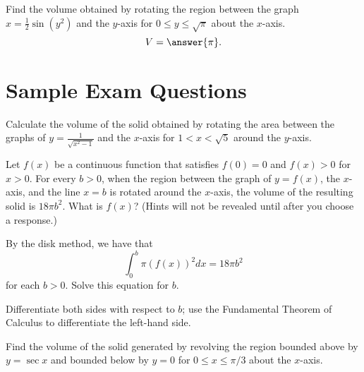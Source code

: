 \documentclass{ximera}
\begin{document}
\begin{exercise}%
Find the volume obtained by rotating the region between the graph $x = \frac{1}{2} \sin (y^2)$ and the $y$-axis for $0 \leq y \leq \sqrt{\pi}$ about the $x$-axis.
\[ V = \answer{\pi}. \]
\end{exercise}


\section*{Sample Exam Questions}



\begin{question}%

Calculate the volume of the solid obtained by rotating the area between the graphs of \(\displaystyle y = \frac{1}{\sqrt{x^2-1}}\) and the \(x\)-axis for \(1 < x < \sqrt{5}\) around the \(y\)-axis.
\begin{multiplechoice}
\choice{\(\pi\)}
\choice[correct]{\(4 \pi\)}
\choice{\(6 \pi\)}
\choice{\(8 \pi\)}
\choice{\(3 \pi\)}
\choice{\(2 \pi\)}
\end{multiplechoice}

\end{question}

\begin{question}%

Let \(f(x)\) be a continuous function that satisfies \(f(0) = 0\) and \(f(x) > 0\) for \(x > 0\). For every \(b > 0\), when the region between the graph of \(y = f(x)\), the \(x\)-axis, and the line \(x=b\) is rotated around the \(x\)-axis, the volume of the resulting solid is \(18 \pi b^2\). What is \(f(x)\)?
(Hints will not be revealed until after you choose a response.)
\begin{multiplechoice}
\end{multiplechoice}
\begin{feedback}
By the disk method, we have that
\[ \int_0^b \pi (f(x))^2 dx = 18 \pi b^2 \]
for each $b > 0$. Solve this equation for $b$.
\begin{hint}
Differentiate both sides with respect to $b$; use the Fundamental Theorem of Calculus to differentiate the left-hand side.
\end{hint}
\end{feedback}
\end{question}

\begin{question}%

Find the volume of the solid generated by revolving the region bounded above by \(y = \sec x\) and bounded below by \(y=0\) for \(0 \leq x \leq \pi/3\) about the \(x\)-axis.
\begin{multiplechoice}
\choice{\(\pi\)}
\choice{\(2 \pi\)}
\choice{\(3 \pi\)}
\choice{\(4 \pi\)}
\end{multiplechoice}

\end{question}
\end{document}
